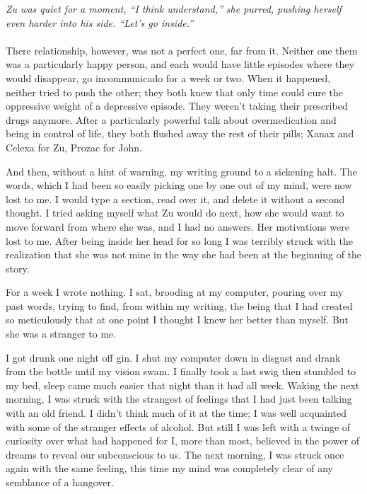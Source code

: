 \textit{	Zu was quiet for a moment, “I think understand,” she purred, pushing herself even harder into his side. “Let’s go inside.”}
\\\\	
	There relationship, however, was not a perfect one, far from it. Neither one them was a particularly happy person, and each would have little episodes where they would disappear, go incommunicado for a week or two. When it happened, neither tried to push the other; they both knew that only time could cure the oppressive weight of a depressive episode. They weren’t taking their prescribed drugs anymore. After a particularly powerful talk about overmedication and being in control of life, they both flushed away the rest of their pills; Xanax and Celexa for Zu, Prozac for John. 
	
	And then, without a hint of warning, my writing ground to a sickening halt. The words, which I had been so easily picking one by one out of my mind, were now lost to me. I would type a section, read over it, and delete it without a second thought. I tried asking myself what Zu would do next, how she would want to move forward from where she was, and I had no answers. Her motivations were lost to me. After being inside her head for so long I was terribly struck with the realization that she was not mine in the way she had been at the beginning of the story.
	
	For a week I wrote nothing. I sat, brooding at my computer, pouring over my past words, trying to find, from within my writing, the being that I had created so meticulously that at one point I thought I knew her better than myself. But she was a stranger to me.
	
	I got drunk one night off gin. I shut my computer down in disgust and drank from the bottle until my vision swam. I finally took a last swig then stumbled to my bed, sleep came much easier that night than it had all week. Waking the next morning, I was struck with the strangest of feelings that I had just been talking with an old friend. I didn’t think much of it at the time; I was well acquainted with some of the stranger effects of alcohol. But still I was left with a twinge of curiosity over what had happened for I, more than most, believed in the power of dreams to reveal our subconscious to us. The next morning, I was struck once again with the same feeling, this time my mind was completely clear of any semblance of a hangover.
	
